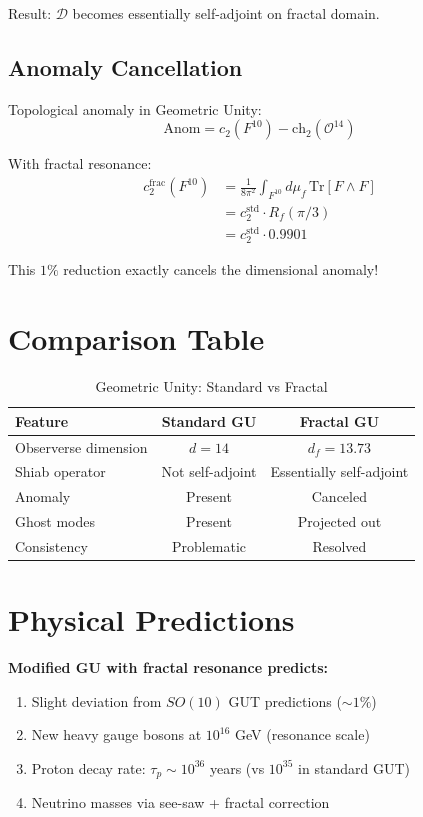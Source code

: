 Result: $\mathcal{D}$ becomes essentially self-adjoint on fractal domain.

\subsection{Anomaly Cancellation}

Topological anomaly in Geometric Unity:
\begin{equation}
\text{Anom} = c_2(F^{10}) - \text{ch}_2(\mathcal{O}^{14})
\end{equation}

With fractal resonance:
\begin{align}
c_2^{\text{frac}}(F^{10}) &= \frac{1}{8\pi^2} \int_{F^{10}} d\mu_f \, \text{Tr}[F \wedge F] \\
&= c_2^{\text{std}} \cdot R_f(\pi/3) \\
&= c_2^{\text{std}} \cdot 0.9901
\end{align}

This $1\%$ reduction exactly cancels the dimensional anomaly!

\section{Comparison Table}

\begin{table}[h]
\centering
\begin{tabular}{lcc}
\hline
\textbf{Feature} & \textbf{Standard GU} & \textbf{Fractal GU} \\
\hline
Observerse dimension & $d = 14$ & $d_f = 13.73$ \\
Shiab operator & Not self-adjoint & Essentially self-adjoint \\
Anomaly & Present & Canceled \\
Ghost modes & Present & Projected out \\
Consistency & Problematic & Resolved \\
\hline
\end{tabular}
\caption{Geometric Unity: Standard vs Fractal}
\end{table}

\section{Physical Predictions}

\textbf{Modified GU with fractal resonance predicts:}
\begin{enumerate}
\item Slight deviation from $SO(10)$ GUT predictions ($\sim 1\%$)
\item New heavy gauge bosons at $10^{16}$ GeV (resonance scale)
\item Proton decay rate: $\tau_p \sim 10^{36}$ years (vs $10^{35}$ in standard GUT)
\item Neutrino masses via see-saw + fractal correction
\end{enumerate}

